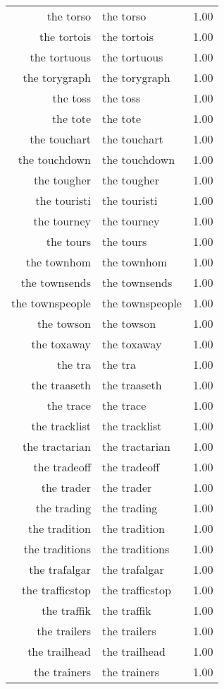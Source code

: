\begin{table}[ht]
\begin{tabular}{rlr}
  the torso & the torso & 1.00 \\ 
  the tortois & the tortois & 1.00 \\ 
  the tortuous & the tortuous & 1.00 \\ 
  the torygraph & the torygraph & 1.00 \\ 
  the toss & the toss & 1.00 \\ 
  the tote & the tote & 1.00 \\ 
  the touchart & the touchart & 1.00 \\ 
  the touchdown & the touchdown & 1.00 \\ 
  the tougher & the tougher & 1.00 \\ 
  the touristi & the touristi & 1.00 \\ 
  the tourney & the tourney & 1.00 \\ 
  the tours & the tours & 1.00 \\ 
  the townhom & the townhom & 1.00 \\ 
  the townsends & the townsends & 1.00 \\ 
  the townspeople & the townspeople & 1.00 \\ 
  the towson & the towson & 1.00 \\ 
  the toxaway & the toxaway & 1.00 \\ 
  the tra & the tra & 1.00 \\ 
  the traaseth & the traaseth & 1.00 \\ 
  the trace & the trace & 1.00 \\ 
  the tracklist & the tracklist & 1.00 \\ 
  the tractarian & the tractarian & 1.00 \\ 
  the tradeoff & the tradeoff & 1.00 \\ 
  the trader & the trader & 1.00 \\ 
  the trading & the trading & 1.00 \\ 
  the tradition & the tradition & 1.00 \\ 
  the traditions & the traditions & 1.00 \\ 
  the trafalgar & the trafalgar & 1.00 \\ 
  the trafficstop & the trafficstop & 1.00 \\ 
  the traffik & the traffik & 1.00 \\ 
  the trailers & the trailers & 1.00 \\ 
  the trailhead & the trailhead & 1.00 \\ 
  the trainers & the trainers & 1.00 \\ 

\end{tabular}
\end{table}
